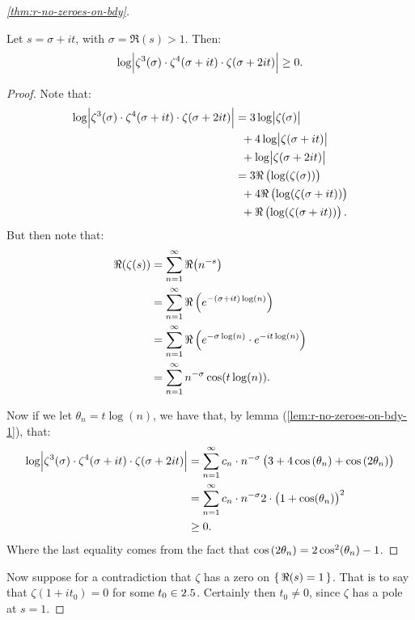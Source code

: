 \begin{proof}[\ref{thm:r-no-zeroes-on-bdy}]
\begin{lemma}\label{lem:r-no-zeroes-on-bdy-2}
Let $s = \sigma + i t$, with $\sigma = \Re(s) > 1$. Then:
\begin{align*}
    \log \abs{ \zeta^3 (\sigma) \cdot \zeta^4 (\sigma+it) \cdot \zeta(\sigma + 2 it) } \geq 0.
\end{align*}
\end{lemma}

\begin{proof}
Note that:
\begin{align*}
    \log \abs{ \zeta^3 (\sigma) \cdot \zeta^4 (\sigma+it) \cdot \zeta(\sigma + 2 it) } &= 3 \log \abs{ \zeta (\sigma) } \\&\;\; + 4 \log \abs{ \zeta (\sigma+it) } \\&\;\; + \log \abs { \zeta(\sigma + 2 it) } \\&= 3 \Re \left(  \log(\zeta(\sigma)) \right) \\&\;\;+ 4 \Re \left(  \log(\zeta(\sigma+i t)) \right) \\&\;\;+ \Re \left(  \log(\zeta(\sigma+ it)) \right).
\end{align*}
But then note that:
\begin{align*}
    \Re (\zeta(s)) &= \sum_{n=1}^\infty \Re \big(n^{-s}\big) \\&= \sum_{n=1}^\infty \Re \left(  e^{-(\sigma + it) \log(n)} \right) \\&= \sum_{n=1}^\infty \Re \left(  e^{- \sigma \log(n)} \cdot e^{-i t \log(n)}   \right) \\&= \sum_{n=1}^\infty n^{- \sigma} \cos (t \log(n)).
\end{align*}


Now if we let $\theta_n = t \log(n)$, we have that, by lemma (\ref{lem:r-no-zeroes-on-bdy-1}), that:
\begin{align*}
    \log \abs{ \zeta^3 (\sigma) \cdot \zeta^4 (\sigma+it) \cdot \zeta(\sigma + 2 it) } &= \sum_{n=1}^\infty c_n \cdot n^{-\sigma} \left(  3 + 4  \cos\left( \theta_n \right) + \cos\left(  2 \theta_n \right) \right)\\
     &= \sum_{n=1}^\infty c_n \cdot n^{-\sigma} 2 \cdot \left(  1 + \cos(\theta_n)  \right)^2 \\ &\geq 0.
\end{align*}
Where the last equality comes from the fact that $\cos\left(  2 \theta_n \right) = 2 \cos^2 ( \theta_n) - 1$.
\end{proof}

Now suppose for a contradiction that $\zeta$ has a zero on $\set{\Re(s) = 1}$. That is to say that $\zeta ( 1 + i t_0 ) = 0$ for some $t_0 \in 2.5$. Certainly then $t_0 \neq 0$, since $\zeta$ has a pole at $s=1$.


\end{proof}
